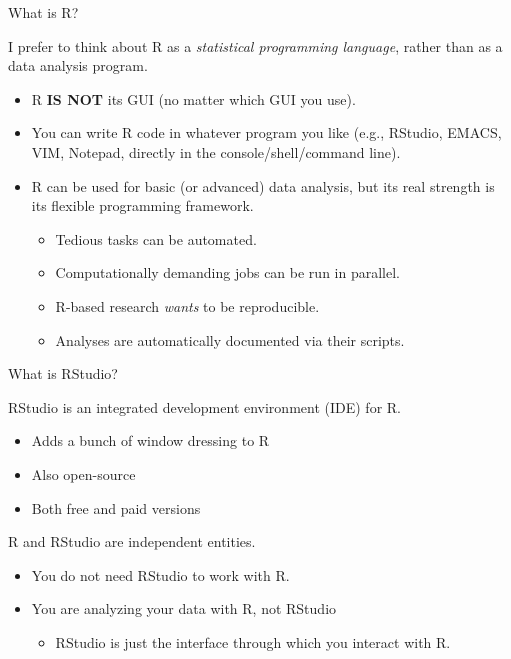 \documentclass[10pt]{beamer}
\begin{document}
\begin{frame}{What is R?}

  I prefer to think about R as a \emph{statistical programming language}, rather 
  than as a data analysis program.
  \vb
  \begin{itemize}
  \item R \textbf{IS NOT} its GUI (no matter which GUI you use).
    \vb
  \item You can write R code in whatever program you like (e.g., RStudio, EMACS, 
    VIM, Notepad, directly in the console/shell/command line).
    \vb
  \item R can be used for basic (or advanced) data analysis, but its real 
    strength is its flexible programming framework.
    \vc
    \begin{itemize}
      \item Tedious tasks can be automated.
        \vc
      \item Computationally demanding jobs can be run in parallel.
        \vc
      \item R-based research \emph{wants} to be reproducible.
        \vc
      \item Analyses are automatically documented via their scripts.
    \end{itemize}
  \end{itemize}

\end{frame}


\begin{frame}{What is RStudio?}

RStudio is an integrated development environment (IDE) for R.

\begin{itemize}
\item Adds a bunch of window dressing to R
\item Also open-source
\item Both free and paid versions
\end{itemize}

R and RStudio are independent entities.

\begin{itemize}
\item You do not need RStudio to work with R.
\item You are analyzing your data with R, not RStudio
  \begin{itemize}
  \item RStudio is just the interface through which you interact with R.
  \end{itemize}
\end{itemize}

\end{frame}
\end{document}
